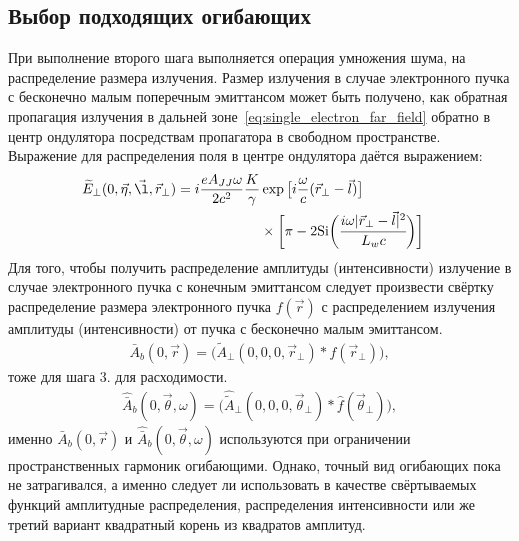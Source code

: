\subsection{Выбор подходящих огибающих}
При выполнение второго шага выполняется операция умножения шума, на распределение размера излучения. Размер излучения в случае электронного пучка с бесконечно малым поперечным эмиттансом может быть получено, как обратная пропагация излучения в дальней зоне~\ref{eq:single_electron_far_field} обратно в центр ондулятора посредствам пропагатора в свободном пространстве. Выражение для распределения поля в центре ондулятора даётся выражением:
\begin{align}
	\widetilde{E}_{\bot}(0, \vec{\eta}, \vec{\l}, \vec{r}_{\bot}) =
	i \frac{e A_{JJ} \omega}{2 c^2}\frac{K}{\gamma} &\exp{\big[i \frac{\omega}{c} (\vec{r}_{\bot} - \vec{l})\big]}\cr & \times \bigg [\pi - 2\text{Si} \bigg( \cfrac{i \omega |\vec{r}_{\bot} - \vec{l}|^2}{L_w c}\bigg)\bigg]
	\label{eq:single_electron_with_offset_and_tilt_near_field_z=0}
\end{align}
Для того, чтобы получить распределение амплитуды (интенсивности) излучение в случае электронного пучка с конечным эмиттансом следует произвести свёртку распределение размера электронного пучка $f(\vec{r})$ с распределением излучения амплитуды (интенсивности) от пучка с бесконечно малым эмиттансом. 
\begin{align}
	\bar{A}_{b} (0, \vec{r}) = \big(\widetilde{A}_{\bot}(0, 0, 0, \vec{r}_{\bot}) \ast f(\vec{r}_{\bot})\big), 
\end{align} 
тоже для шага 3. для расходимости.
\begin{align}
	\hat{\bar{A}}_{b} (0, \vec{\theta}, \omega) = \big(\hat{\widetilde{A}}_{\bot}(0, 0, 0, \vec{\theta}_{\bot}) \ast \hat{f}(\vec{\theta}_{\bot})\big), 
\end{align} 
именно $\bar{A}_{b} (0, \vec{r})$ и $\hat{\bar{A}}_{b} (0, \vec{\theta}, \omega)$ используются при ограничении пространственных гармоник огибающими. Однако, точный вид огибающих пока не затрагивался, а именно следует ли использовать в качестве свёртываемых функций амплитудные распределения, распределения интенсивности или же третий вариант квадратный корень из квадратов амплитуд.

